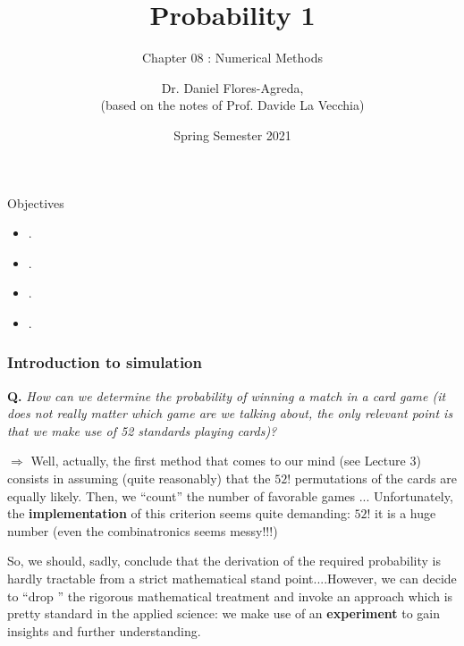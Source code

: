 \documentclass[notes=show,smaller,handout]{beamer}\usepackage[]{graphicx}\usepackage[]{color}
\begin{document}
\title[S110015]{Probability 1}
\subtitle{Chapter 08 : Numerical Methods}
\author[Flores-Agreda, La Vecchia]{Dr. Daniel Flores-Agreda, \\[0.5em] \tiny{(based on the notes of Prof. Davide La Vecchia)}}
\date{Spring Semester 2021}

\begin{frame}
\titlepage
\end{frame}

\begin{frame}{Objectives}
  \begin{itemize}
  \item . \bigskip
  \item . \bigskip
  \item . \bigskip
  \item . \bigskip
  \end{itemize}
\end{frame}


\begin{frame}
\frametitle{Introduction to simulation}

\color{red} \textbf{Q.} \textit{How can we determine the probability of winning a match in a card game (it does not really matter which game are we talking about, the only relevant point is that we make use of 52 standards playing cards)?} \color{black}

\vspace{1cm}

$\Rightarrow$  Well, actually, the first method that comes to our mind (see Lecture 3) consists in assuming (quite reasonably) that the
$52!$ permutations of the cards are equally likely. Then, we ``count'' the number of favorable games ... \pause
Unfortunately, the \textbf{implementation} of this criterion seems quite demanding: $52!$ it is a huge number (even the combinatronics
seems messy!!!)

\vspace{0.4cm}
So, we should, sadly, conclude that  the derivation of the required probability is hardly tractable from a strict mathematical stand point....However,
we can decide to ``drop '' the rigorous mathematical treatment and invoke an approach which is pretty standard
in the applied science: we make use of an \textbf{experiment} to gain insights and further understanding.


\end{frame}
\end{document}
